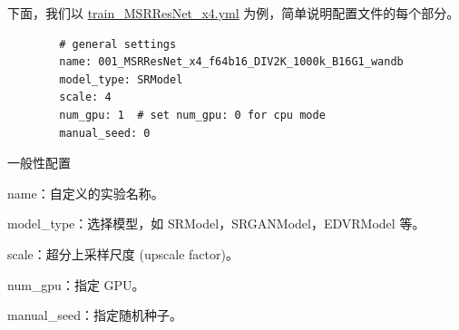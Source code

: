 \documentclass[../main.tex]{subfiles}
\begin{document}
	下面，我们以 \href{https://github.com/XPixelGroup/BasicSR/blob/master/options/train/SRResNet_SRGAN/train_MSRResNet_x4.yml}{train\_MSRResNet\_x4.yml} 为例，简单说明配置文件的每个部分。
	
	\begin{verbatim}
		# general settings
		name: 001_MSRResNet_x4_f64b16_DIV2K_1000k_B16G1_wandb
		model_type: SRModel
		scale: 4
		num_gpu: 1  # set num_gpu: 0 for cpu mode
		manual_seed: 0
	\end{verbatim}
	\begin{exampleBox}[righthand ratio=0.00, sidebyside, sidebyside align=center, lower separated=false]{一般性配置}
		
		name：自定义的实验名称。
		
		model\_type：选择模型，如 SRModel，SRGANModel，EDVRModel 等。
		
		scale：超分上采样尺度 (upscale factor)。
		
		num\_gpu：指定 GPU。
		
		manual\_seed：指定随机种子。
	\end{exampleBox}
	
\end{document}
